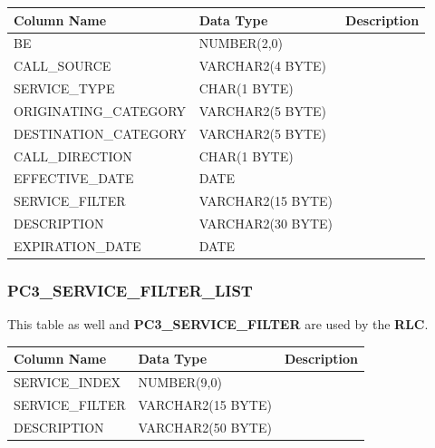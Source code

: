 \documentclass[12pt,twoside]{article}
\begin{document}
\begin{center}
\begin{tabular}{lll}
\hline
 \textbf{Column Name}   &  \textbf{Data Type}  &  \textbf{Description}  \\
\hline
 BE                     &  NUMBER(2,0)         &                        \\
 CALL\_SOURCE           &  VARCHAR2(4 BYTE)    &                        \\
 SERVICE\_TYPE          &  CHAR(1 BYTE)        &                        \\
 ORIGINATING\_CATEGORY  &  VARCHAR2(5 BYTE)    &                        \\
 DESTINATION\_CATEGORY  &  VARCHAR2(5 BYTE)    &                        \\
 CALL\_DIRECTION        &  CHAR(1 BYTE)        &                        \\
 EFFECTIVE\_DATE        &  DATE                &                        \\
 SERVICE\_FILTER        &  VARCHAR2(15 BYTE)   &                        \\
 DESCRIPTION            &  VARCHAR2(30 BYTE)   &                        \\
 EXPIRATION\_DATE       &  DATE                &                        \\
\hline
\end{tabular}
\end{center}



\normalsize
\subsubsection{PC3\_SERVICE\_FILTER\_LIST}
\label{sec-9-14-9}

   This table as well and \textbf{PC3\_SERVICE\_FILTER} are used by the \textbf{RLC}.
\scriptsize

\begin{center}
\begin{tabular}{lll}
\hline
 \textbf{Column Name}  &  \textbf{Data Type}  &  \textbf{Description}  \\
\hline
 SERVICE\_INDEX        &  NUMBER(9,0)         &                        \\
 SERVICE\_FILTER       &  VARCHAR2(15 BYTE)   &                        \\
 DESCRIPTION           &  VARCHAR2(50 BYTE)   &                        \\
\hline
\end{tabular}
\end{center}
\end{document}
